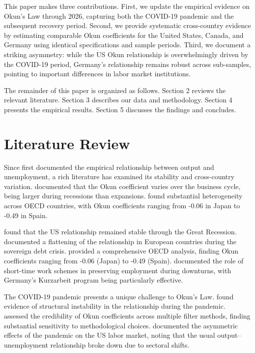 \documentclass[12pt,a4paper]{article}
\begin{document}
This paper makes three contributions. First, we update the empirical evidence on Okun's Law through 2026, capturing both the COVID-19 pandemic and the subsequent recovery period. Second, we provide systematic cross-country evidence by estimating comparable Okun coefficients for the United States, Canada, and Germany using identical specifications and sample periods. Third, we document a striking asymmetry: while the US Okun relationship is overwhelmingly driven by the COVID-19 period, Germany's relationship remains robust across sub-samples, pointing to important differences in labor market institutions.

The remainder of this paper is organized as follows. Section 2 reviews the relevant literature. Section 3 describes our data and methodology. Section 4 presents the empirical results. Section 5 discusses the findings and concludes.

\section{Literature Review}

Since \citet{okun1962potential} first documented the empirical relationship between output and unemployment, a rich literature has examined its stability and cross-country variation. \citet{knotek2007okun} documented that the Okun coefficient varies over the business cycle, being larger during recessions than expansions. \citet{ball2017okun} found substantial heterogeneity across OECD countries, with Okun coefficients ranging from -0.06 in Japan to -0.49 in Spain.

\citet{neely2010okun} found that the US relationship remained stable through the Great Recession. \citet{blanchard2013okun} documented a flattening of the relationship in European countries during the sovereign debt crisis. \citet{ball2017okun} provided a comprehensive OECD analysis, finding Okun coefficients ranging from -0.06 (Japan) to -0.49 (Spain). \citet{oecd2020kurzarbeit} documented the role of short-time work schemes in preserving employment during downturns, with Germany's Kurzarbeit program being particularly effective.

The COVID-19 pandemic presents a unique challenge to Okun's Law. \citet{russnak2023okun} found evidence of structural instability in the relationship during the pandemic. \citet{boda2023okun} assessed the credibility of Okun coefficients across multiple filter methods, finding substantial sensitivity to methodological choices. \citet{gehrke2020okun} documented the asymmetric effects of the pandemic on the US labor market, noting that the usual output--unemployment relationship broke down due to sectoral shifts.
\end{document}
